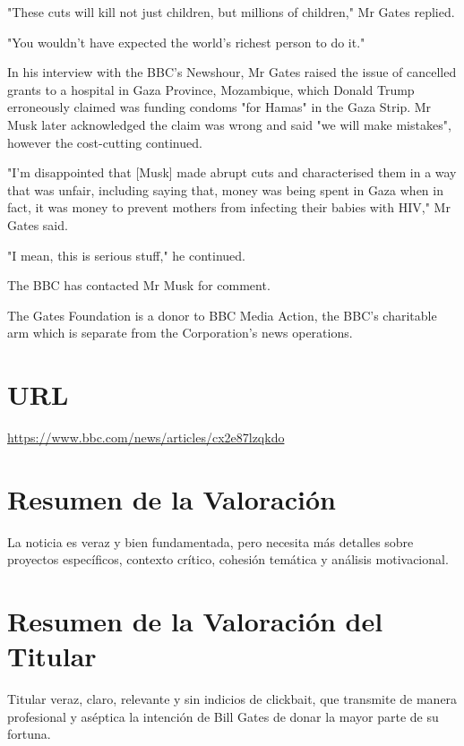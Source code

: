 \documentclass[10pt,a4paper]{article}
\begin{document}
\par\medskip
"These cuts will kill not just children, but millions of children," Mr Gates replied.
\par\medskip
"You wouldn't have expected the world's richest person to do it."
\par\medskip
In his interview with the BBC's Newshour, Mr Gates raised the issue of cancelled grants to a hospital in Gaza Province, Mozambique, which Donald Trump erroneously claimed was funding condoms "for Hamas" in the Gaza Strip. Mr Musk later acknowledged the claim was wrong and said "we will make mistakes", however the cost-cutting continued.
\par\medskip
"I'm disappointed that [Musk] made abrupt cuts and characterised them in a way that was unfair, including saying that, money was being spent in Gaza when in fact, it was money to prevent mothers from infecting their babies with HIV," Mr Gates said.
\par\medskip
"I mean, this is serious stuff," he continued.
\par\medskip
The BBC has contacted Mr Musk for comment.
\par\medskip
The Gates Foundation is a donor to BBC Media Action, the BBC's charitable arm which is separate from the Corporation's news operations.
\vspace{1em}

\section*{URL}
\url{ https://www.bbc.com/news/articles/cx2e87lzqkdo }
\vspace{1em}

\section*{Resumen de la Valoración}
    La noticia es veraz y bien fundamentada, pero necesita m\'{a}s detalles sobre proyectos espec\'{i}ficos, contexto cr\'{i}tico, cohesi\'{o}n tem\'{a}tica y an\'{a}lisis motivacional.
\vspace{1em}

\section*{Resumen de la Valoración del Titular}
    Titular veraz, claro, relevante y sin indicios de clickbait, que transmite de manera profesional y as\'{e}ptica la intenci\'{o}n de Bill Gates de donar la mayor parte de su fortuna.
\vspace{1em}
\end{document}

